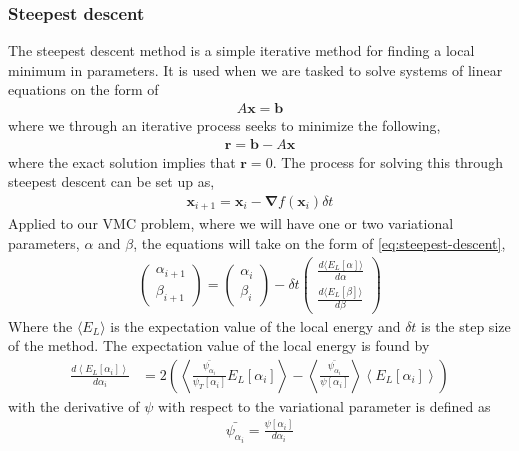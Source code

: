 \documentclass[11pt]{article}
\newcommand{\expect}[1]{\left\langle{#1}\right\rangle}
\begin{document}
\subsubsection{Steepest descent}
The steepest descent method is a simple iterative method for finding a local minimum in parameters. It is used when we are tasked to solve systems of linear equations on the form of
\begin{align*}
	A \mathbf{x} = \mathbf{b}
\end{align*}
where we through an iterative process seeks to minimize the following,
\begin{align*}
	\mathbf{r} = \mathbf{b} - A \mathbf{x}
\end{align*}
where the exact solution implies that $\mathbf{r}=0$. The process for solving this through steepest descent can be set up as, 
\begin{align}
	\mathbf{x}_{i+1} = \mathbf{x}_i - \bm{\nabla} f(\mathbf{x}_i) \delta t
	\label{eq:steepest-descent}
\end{align}
Applied to our VMC problem, where we will have one or two variational parameters, $\alpha$ and $\beta$, the equations will take on the form of \eqref{eq:steepest-descent},
\begin{align}
	\begin{pmatrix}
		\alpha_{i+1} \\
		\beta_{i+1}
	\end{pmatrix}
	=
	\begin{pmatrix}
		\alpha_{i} \\
		\beta_{i}
	\end{pmatrix}
	- \delta t
	\begin{pmatrix}
		\frac{d\langle E_L[\alpha] \rangle}{d\alpha} \\
		\frac{d\langle E_L[\beta] \rangle}{d\beta}
	\end{pmatrix}
\end{align}
Where the $\langle E_L \rangle$ is the expectation value of the local energy and $\delta t$ is the step size of the method. The expectation value of the local energy is found by
\begin{align}
	\frac{d\expect{E_L[\alpha_i]}}{d\alpha_i} &= 2 \left( \expect{ \frac{\bar{\psi_{\alpha_i}}}{\psi_T[\alpha_i]}E_L[\alpha_i] } - \expect{\frac{\bar{\psi_{\alpha_i}}}{\psi[\alpha_i]}}\expect{E_L[\alpha_i]} \right)
	\label{eq:local-energy-variational-derivative}
\end{align}
with the derivative of $\psi$ with respect to the variational parameter is defined as
\begin{align*}
	\bar{\psi_{\alpha_i}} = \frac{\psi[\alpha_i]}{d\alpha_i}
\end{align*}
\end{document}

